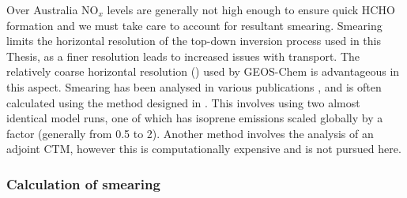     Over Australia NO$_x$ levels are generally not high enough to ensure quick HCHO formation and we must take care to account for resultant smearing.
    Smearing limits the horizontal resolution of the top-down inversion process used in this Thesis, as a finer resolution leads to increased issues with transport.
    The relatively coarse horizontal resolution (\lowhr) used by GEOS-Chem is advantageous in this aspect.
    Smearing has been analysed in various publications \parencite[e.g.][]{Martin2003, Palmer2003, Millet2006, Stavrakou2009, Marais2012, Barkley2013, Zhu2014, Wolfe2016, Surl2018}, and is often calculated using the method designed in \textcite{Palmer2003}.
    This involves using two almost identical model runs, one of which has isoprene emissions scaled globally by a factor (generally from 0.5 to 2).
    Another method \parencite[e.g.][]{Stavrakou2009} involves the analysis of an adjoint CTM, however this is computationally expensive and is not pursued here.
    
    
    \subsubsection{Calculation of smearing}
      \label{BioIsop:method:smearing:calculation}
      
